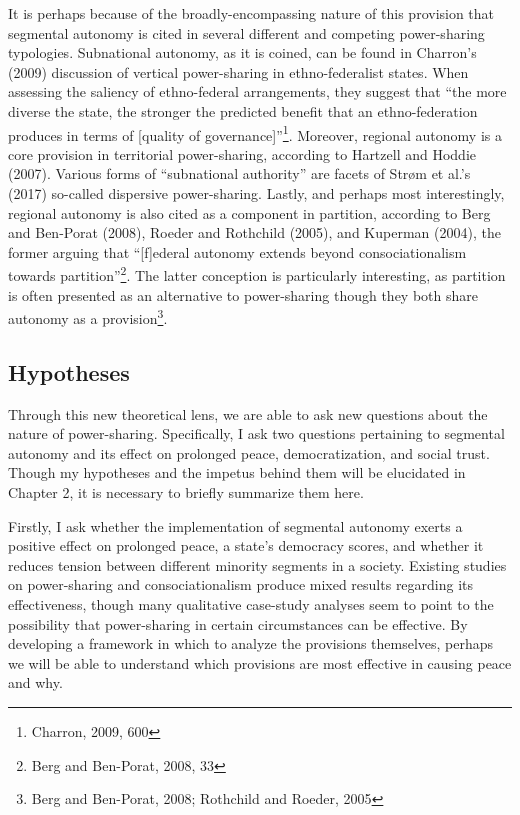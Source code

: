 \documentclass[12pt]{article}
\begin{document}
It is perhaps because of the broadly-encompassing nature of this provision that segmental autonomy is cited in several different and competing power-sharing typologies. Subnational autonomy, as it is coined, can be found in Charron’s (2009) discussion of vertical power-sharing in ethno-federalist states. When assessing the saliency of ethno-federal arrangements, they suggest that “the more diverse the state, the stronger the predicted benefit that an ethno-federation produces in terms of [quality of governance]”\footnote{Charron, 2009, 600}. Moreover, regional autonomy is a core provision in territorial power-sharing, according to Hartzell and Hoddie (2007). Various forms of “subnational authority” are facets of Strøm et al.’s (2017) so-called dispersive power-sharing. Lastly, and perhaps most interestingly, regional autonomy is also cited as a component in partition, according to Berg and Ben-Porat (2008), Roeder and Rothchild (2005), and Kuperman (2004), the former arguing that “[f]ederal autonomy extends beyond consociationalism towards partition”\footnote{Berg and Ben-Porat, 2008, 33}. The latter conception is particularly interesting, as partition is often presented as an alternative to power-sharing though they both share autonomy as a provision\footnote{Berg and Ben-Porat, 2008; Rothchild and Roeder, 2005}. 

\subsection{Hypotheses} 
Through this new theoretical lens, we are able to ask new questions about the nature of power-sharing. Specifically, I ask two questions pertaining to segmental autonomy and its effect on prolonged peace, democratization, and social trust. Though my hypotheses and the impetus behind them will be elucidated in Chapter 2, it is necessary to briefly summarize them here.

Firstly, I ask whether the implementation of segmental autonomy exerts a positive effect on prolonged peace, a state’s democracy scores, and whether it reduces tension between different minority segments in a society. Existing studies on power-sharing and consociationalism produce mixed results regarding its effectiveness, though many qualitative case-study analyses seem to point to the possibility that power-sharing in certain circumstances can be effective. By developing a framework in which to analyze the provisions themselves, perhaps we will be able to understand which provisions are most effective in causing peace and why. 
\end{document}
